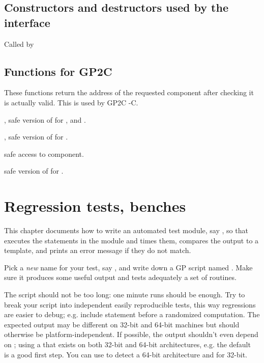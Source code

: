{



\section{Constructors and destructors used by the  interface}

\item Called by 


\section{Functions for GP2C}


These functions return the address of the requested component after checking
it is actually valid. This is used by GP2C -C.

, safe version of  for ,
 and .

, safe version of  for .

 safe access to  component.

 safe version of
 for .

\newpage

\chapter{Regression tests, benches}

This chapter documents how to write an automated test module, say ,
so that  executes the statements in the  module
and times them, compares the output to a template, and prints an error
message if they do not match.

\item Pick a \emph{new} name for your test, say , and write down a
GP script named . Make sure it produces some useful output and tests
adequately a set of routines.

\item The script should not be too long: one minute runs should be enough.
Try to break your script into independent easily reproducible tests, this way
regressions are easier to debug; e.g. include  statement before
a randomized computation. The expected output may be different on 32-bit and
64-bit machines but should otherwise be platform-independent. If possible, the
output shouldn't even depend on ; using a 
that exists on both 32-bit and 64-bit architectures, e.g. the
default~ is a good first step. You can use
 to detect a 64-bit architecture and
 for 32-bit.

}

